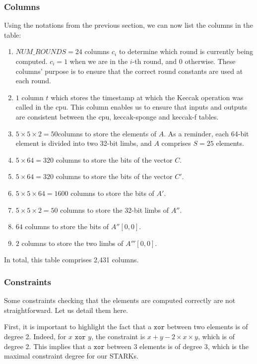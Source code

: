 \subsubsection{Columns}
Using the notations from the previous section, we can now list the columns in the table:
\begin{enumerate}
    \item $NUM\_ROUNDS = 24$ columns $c_i$ to determine which round is currently being computed. $c_i = 1$ when we are in the $i$-th round, and 0 otherwise. These columns' purpose is to ensure that the correct round constants are used at each round.
    \item $1$ column $t$ which stores the timestamp at which the Keccak operation was called in the cpu. This column enables us to ensure that inputs and outputs are consistent between the cpu, keccak-sponge and keccak-f tables.
    \item $5 \times 5 \times 2 = 50 $columns to store the elements of $A$. As a reminder, each 64-bit element is divided into two 32-bit limbs, and $A$ comprises $S = 25$ elements.
    \item $5 \times 64 = 320$ columns to store the bits of the vector $C$.
    \item $5 \times 64 = 320$ columns to store the bits of the vector $C'$.
    \item $5 \times 5 \times 64 = 1600$ columns to store the bits of $A'$.
    \item $5 \times 5 \times 2 = 50$ columns to store the 32-bit limbs of $A''$.
    \item $64$ columns to store the bits of $A''[0, 0]$.
    \item $2$ columns to store the two limbs of $A'''[0, 0]$.
\end{enumerate}

In total, this table comprises 2,431 columns.

\subsubsection{Constraints}
Some constraints checking that the elements are computed correctly are not straightforward. Let us detail them here.

First, it is important to highlight the fact that a $\texttt{xor}$ between two elements is of degree 2. Indeed, for $x \texttt{ xor } y$, the constraint is $x + y - 2 \times x \times y$, which is of degree 2. This implies that a $\texttt{xor}$ between 3 elements is of degree 3, which is the maximal constraint degree for our STARKs.

